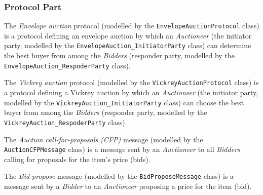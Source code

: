 \subsubsection*{Protocol Part}

The \textit{Envelope auction} protocol (modelled by the \texttt{EnvelopeAuctionProtocol} class) is a protocol defining an envelope auction by which an \textit{Auctioneer} (the initiator party, modelled by the \texttt{EnvelopeAuction\_InitiatorParty} class) can determine the best buyer from among the \textit{Bidders} (responder party, modelled by the \texttt{EnvelopeAuction\_RespoderParty} class).

The \textit{Vickrey auction} protocol (modelled by the \texttt{VickreyAuctionProtocol} class) is a protocol defining a Vickrey auction by which an \textit{Auctioneer} (the initiator party, modelled by the \texttt{VickreyAuction\_InitiatorParty} class) can choose the best buyer from among the \textit{Bidders} (responder party, modelled by the \texttt{VickreyAuction\_RespoderParty} class).



The \textit{Auction call-for-proposals (CFP)} message (modelled by the \texttt{AuctionCFPMessage} class) is a message sent by an \textit{Auctioneer} to all \textit{Bidders} calling for proposals for the item's price (bids).

The \textit{Bid propose} message (modelled by the \texttt{BidProposeMessage} class) is a message sent by a \textit{Bidder} to an \textit{Auctioneer} proposing a price for the item (bid).

